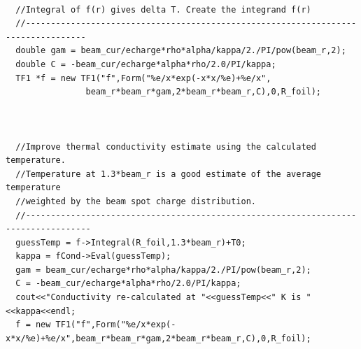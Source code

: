 \documentclass[12pt]{article}
\begin{document}
\begin{lstlisting}
  
  //Integral of f(r) gives delta T. Create the integrand f(r) 
  //----------------------------------------------------------------------------------
  double gam = beam_cur/echarge*rho*alpha/kappa/2./PI/pow(beam_r,2);
  double C = -beam_cur/echarge*alpha*rho/2.0/PI/kappa;
  TF1 *f = new TF1("f",Form("%e/x*exp(-x*x/%e)+%e/x",
			    beam_r*beam_r*gam,2*beam_r*beam_r,C),0,R_foil);


  
  //Improve thermal conductivity estimate using the calculated temperature.
  //Temperature at 1.3*beam_r is a good estimate of the average temperature
  //weighted by the beam spot charge distribution.
  //-----------------------------------------------------------------------------------
  guessTemp = f->Integral(R_foil,1.3*beam_r)+T0;
  kappa = fCond->Eval(guessTemp);
  gam = beam_cur/echarge*rho*alpha/kappa/2./PI/pow(beam_r,2);
  C = -beam_cur/echarge*alpha*rho/2.0/PI/kappa;
  cout<<"Conductivity re-calculated at "<<guessTemp<<" K is "<<kappa<<endl;
  f = new TF1("f",Form("%e/x*exp(-x*x/%e)+%e/x",beam_r*beam_r*gam,2*beam_r*beam_r,C),0,R_foil);




\end{lstlisting}
\end{document}
